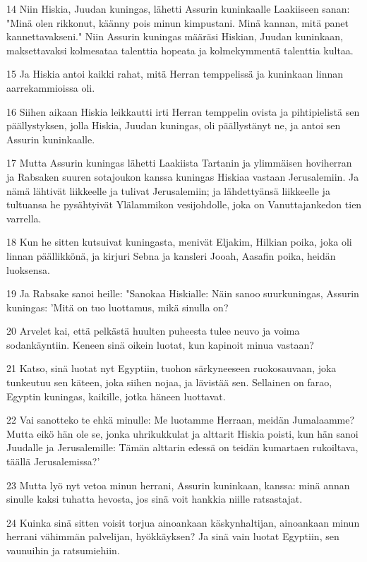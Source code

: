 \par 14 Niin Hiskia, Juudan kuningas, lähetti Assurin kuninkaalle Laakiiseen sanan: "Minä olen rikkonut, käänny pois minun kimpustani. Minä kannan, mitä panet kannettavakseni." Niin Assurin kuningas määräsi Hiskian, Juudan kuninkaan, maksettavaksi kolmesataa talenttia hopeata ja kolmekymmentä talenttia kultaa.
\par 15 Ja Hiskia antoi kaikki rahat, mitä Herran temppelissä ja kuninkaan linnan aarrekammioissa oli.
\par 16 Siihen aikaan Hiskia leikkautti irti Herran temppelin ovista ja pihtipielistä sen päällystyksen, jolla Hiskia, Juudan kuningas, oli päällystänyt ne, ja antoi sen Assurin kuninkaalle.
\par 17 Mutta Assurin kuningas lähetti Laakiista Tartanin ja ylimmäisen hoviherran ja Rabsaken suuren sotajoukon kanssa kuningas Hiskiaa vastaan Jerusalemiin. Ja nämä lähtivät liikkeelle ja tulivat Jerusalemiin; ja lähdettyänsä liikkeelle ja tultuansa he pysähtyivät Ylälammikon vesijohdolle, joka on Vanuttajankedon tien varrella.
\par 18 Kun he sitten kutsuivat kuningasta, menivät Eljakim, Hilkian poika, joka oli linnan päällikkönä, ja kirjuri Sebna ja kansleri Jooah, Aasafin poika, heidän luoksensa.
\par 19 Ja Rabsake sanoi heille: "Sanokaa Hiskialle: Näin sanoo suurkuningas, Assurin kuningas: 'Mitä on tuo luottamus, mikä sinulla on?
\par 20 Arvelet kai, että pelkästä huulten puheesta tulee neuvo ja voima sodankäyntiin. Keneen sinä oikein luotat, kun kapinoit minua vastaan?
\par 21 Katso, sinä luotat nyt Egyptiin, tuohon särkyneeseen ruokosauvaan, joka tunkeutuu sen käteen, joka siihen nojaa, ja lävistää sen. Sellainen on farao, Egyptin kuningas, kaikille, jotka häneen luottavat.
\par 22 Vai sanotteko te ehkä minulle: Me luotamme Herraan, meidän Jumalaamme? Mutta eikö hän ole se, jonka uhrikukkulat ja alttarit Hiskia poisti, kun hän sanoi Juudalle ja Jerusalemille: Tämän alttarin edessä on teidän kumartaen rukoiltava, täällä Jerusalemissa?'
\par 23 Mutta lyö nyt vetoa minun herrani, Assurin kuninkaan, kanssa: minä annan sinulle kaksi tuhatta hevosta, jos sinä voit hankkia niille ratsastajat.
\par 24 Kuinka sinä sitten voisit torjua ainoankaan käskynhaltijan, ainoankaan minun herrani vähimmän palvelijan, hyökkäyksen? Ja sinä vain luotat Egyptiin, sen vaunuihin ja ratsumiehiin.
